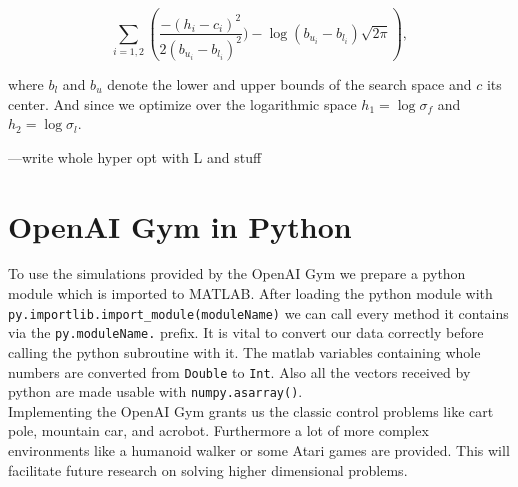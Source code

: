 $$\sum_{i=1,2}\left(\frac{-(h_i-c_i)^2}{2(b_{u_i}-b_{l_i})^2}) - \log(b_{u_i}-b_{l_i})\sqrt{2\pi} \right),$$

where $b_l$ and $b_u$ denote the lower and upper bounds of the search space and $c$ its center. And since we optimize over the logarithmic space $h_1 = \log\sigma_f$ and $h_2 = \log\sigma_l$.


---write whole hyper opt with L and stuff

\section{OpenAI Gym in Python}
To use the simulations provided by the OpenAI Gym we prepare a python module which is imported to MATLAB. After loading the python module with \verb|py.importlib.import_module(moduleName)| we can call every method it contains via the \verb|py.moduleName.| prefix. It is vital to convert our data correctly before calling the python subroutine with it. The matlab variables containing whole numbers are converted from \verb|Double| to \verb|Int|. Also all the vectors received by python are made usable with \verb|numpy.asarray()|.\\
Implementing the OpenAI Gym grants us the classic control problems like cart pole, mountain car, and acrobot. Furthermore a lot of more complex environments like a humanoid walker or some Atari games are provided\cite{DBLP:journals/corr/BrockmanCPSSTZ16}. This will facilitate future research on solving higher dimensional problems.
